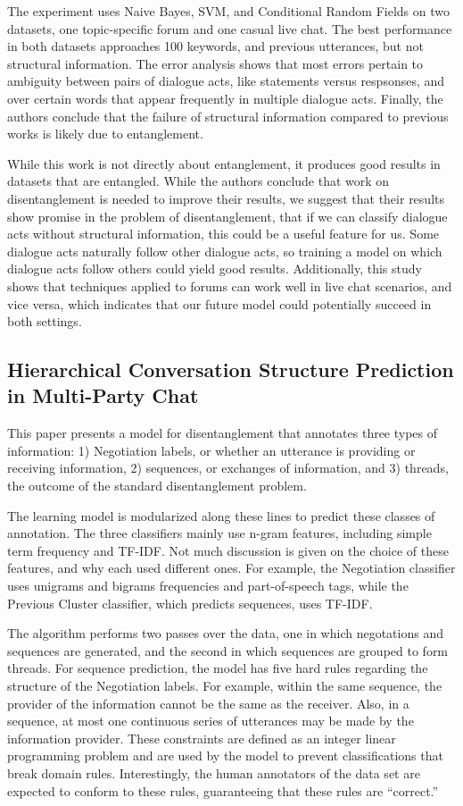\documentclass{article}
\begin{document}
The experiment uses Naive Bayes, SVM, and Conditional Random Fields on two
datasets, one topic-specific forum and one casual live chat. The best
performance in both datasets approaches 100%
keywords, and previous utterances, but not structural information. The error
analysis shows that most errors pertain to ambiguity between pairs of dialogue
acts, like statements versus respsonses, and over certain words that appear
frequently in multiple dialogue acts. Finally, the authors conclude that the
failure of structural information compared to previous works is likely due to
entanglement.

While this work is not directly about entanglement, it produces good results in
datasets that are entangled. While the authors conclude that work on
disentanglement is needed to improve their results, we suggest that their
results show promise in the problem of disentanglement, that if we can classify
dialogue acts without structural information, this could be a useful feature
for us. Some dialogue acts naturally follow other dialogue acts, so training a
model on which dialogue acts follow others could yield good results.
Additionally, this study shows that techniques applied to forums can work well
in live chat scenarios, and vice versa, which indicates that our future model
could potentially succeed in both settings.

\subsection{Hierarchical Conversation Structure Prediction in Multi-Party Chat}

This paper presents a model for disentanglement that annotates three types of
information: 1) Negotiation labels, or whether an utterance is providing or
receiving information, 2) sequences, or exchanges of information, and 3)
threads, the outcome of the standard disentanglement problem.

The learning model is modularized along these lines to predict these classes of
annotation. The three classifiers mainly use n-gram features, including simple
term frequency and TF-IDF. Not much discussion is given on the choice of these
features, and why each used different ones. For example, the Negotiation
classifier uses unigrams and bigrams frequencies and part-of-speech tags, while
the Previous Cluster classifier, which predicts sequences, uses TF-IDF. 

The algorithm performs two passes over the data, one in which negotations and
sequences are generated, and the second in which sequences are grouped to form
threads. For sequence prediction, the model has five hard rules regarding the
structure of the Negotiation labels. For example, within the same sequence, the
provider of the information cannot be the same as the receiver. Also, in a
sequence, at most one continuous series of utterances may be made by the
information provider. These constraints are defined as an integer linear
programming problem and are used by the model to prevent classifications that
break domain rules. Interestingly, the human annotators of the data set are
expected to conform to these rules, guaranteeing that these rules are
“correct.”
\end{document}
